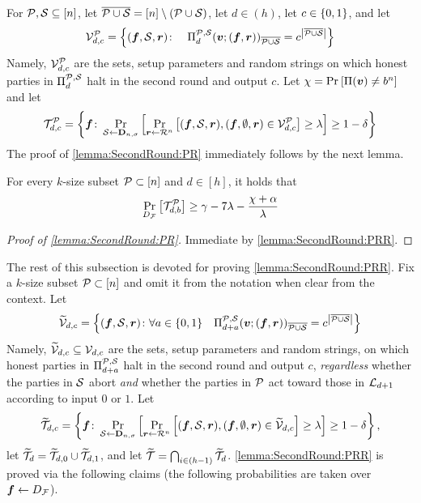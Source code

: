 For $\mathcal{P}, \mathcal{S} \subseteq [n]$, let ${\overline{\mathcal{P} \cup \mathcal{S}}} = [n] \setminus (\mathcal{P} \cup {\cal{S}})$, let $d\in (h)$, let $c\in \{0,1\}$, and let
\[
\mathcal{V}^{\mathcal{P}}_{d,c} = \left\{({ \boldsymbol{f}},{\cal{S}},{ \boldsymbol{r}}) \colon \quad \Pi^{\mathcal{P},\mathcal{S}}_d({ \boldsymbol{v}};({ \boldsymbol{f}},{ \boldsymbol{r}}))_{\overline{\mathcal{P} \cup \mathcal{S}}} = c^{\left|{\overline{\mathcal{P} \cup \mathcal{S}}}\right|}\right\}
\]
Namely, $\mathcal{V}^{\mathcal{P}}_{d,c}$ are the sets, setup parameters and random strings on which honest parties in $\Pi^{\mathcal{P},\mathcal{S}}_{d}$ halt in the second round and output $c$. Let $\chi = \Pr_{}\left[ \Pi({ \boldsymbol{v}}) \ne b^n\right]$ and let
\[
\mathcal{T}_{d,c}^{\mathcal{P}} = \left\{{ \boldsymbol{f}} \colon \Pr_{{\cal{S}} \gets \mathbf{D}_{n,\sigma}}\left[\Pr_{{ \boldsymbol{r}} \gets \mathcal{R}^n}\left[({ \boldsymbol{f}},\mathcal{S},{ \boldsymbol{r}}),({ \boldsymbol{f}},\emptyset,{ \boldsymbol{r}}) \in \mathcal{V}^{\mathcal{P}}_{d,c} \right] \ge \lambda \right] \ge 1-\delta\right\}
\]
The proof of  \cref{lemma:SecondRound:PR} immediately follows by the next lemma.
\begin{lemma}\label{lemma:SecondRound:PRR}
For every $k$-size subset $\mathcal{P} \subset [n]$ and $d\in [h]$,
it holds that
\begin{align*}
\Pr_{ D_{\cal F}}\left[\mathcal{T}_{d,b}^{\mathcal{P}}\right] \ge \gamma- 7\lambda- \frac{\chi + \alpha }{\lambda}
\end{align*}
\end{lemma}
\begin{proof}[Proof of \cref{lemma:SecondRound:PR}]
Immediate by \cref{lemma:SecondRound:PRR}.
\end{proof}
\newcommand{\tV}{\widetilde{\cV}}
\newcommand{\tT}{{\widetilde{\cT}}}


The rest of this subsection is devoted for proving \cref{lemma:SecondRound:PRR}. Fix a $k$-size subset $\mathcal{P} \subset [n]$ and omit it from the notation when clear from the context.
Let
\[
\tV_{d,c} = \set{(\vf,\cs,\vr) \colon \forall a\in \zo \quad \PP_{d+a}(\vv;(\vf,\vr))_\ops = c^{\size{\ops}}}
\]
Namely, $\tV_{d,c} \subseteq \cV_{d,c}$ are the sets, setup parameters and random strings, on which honest parties in $\Pi^{\mathcal{P},\mathcal{S}}_{d+a}$ halt in the second round and output $c$, \emph{regardless} whether the parties in $\mathcal{S}$ abort \emph{and} whether the parties in $\mathcal{P}$ act toward those in ${\cal{L}}_{d+1}$ according to input $0$ or $1$.
Let
\[
\tT_{d,c} = \set{\vf \colon \ppr{\cs \gets \bns}{\ppr{\vr \gets \rn}{(\vf,\cS,\vr),(\vf,\emptyset,\vr) \in \tV_{d,c} } \ge \lambda} \ge 1-\delta},
\]
let $\tT_{d} = \tT_{d,0}\cup \tT_{d,1}$, and let $\tT = \bigcap_{i \in (h-1)}\tT_{d}$. \cref{lemma:SecondRound:PRR} is proved via the following claims (the following probabilities are taken over ${ \boldsymbol{f}} \gets D_{\cal F}$).


